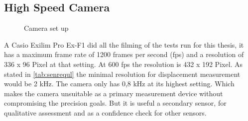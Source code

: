 

\subsection{High Speed Camera}

\begin{figure}
    \centering
    
    \caption{Camera set up}
    \label{fig:cam}
\end{figure}

 A Casio Exilim Pro Ex-F1 did all the filming of the tests run for this thesis, it has a maximum frame rate of 1200 frames per second (fps) and a resolution of 336 x 96 Pixel at that setting. At 600 fps the resolution is 432 x 192 Pixel.
As stated in \autoref{tab:senrequl} the minimal resolution for displacement measurement would be 2 kHz. The camera only has 0,8 kHz at its highest setting. Which makes the camera unsuitable as a primary measurement device without compromising the precision goals. But it is useful a secondary sensor, for qualitative assessment and as a confidence check for other sensors.

